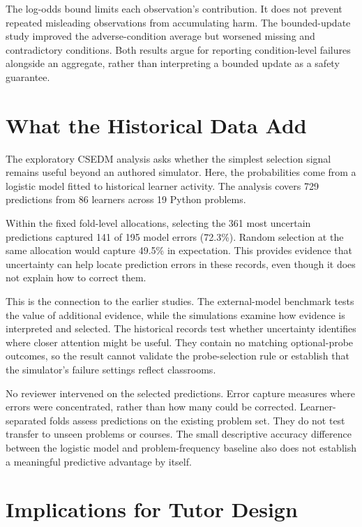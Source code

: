 The log-odds bound limits each observation's contribution. It does not prevent repeated misleading observations from accumulating
harm. The bounded-update study improved the adverse-condition average but worsened missing and contradictory conditions. Both results argue for
reporting condition-level failures alongside an aggregate, rather than interpreting a bounded update as a safety guarantee.

\section{What the Historical Data Add}

The exploratory CSEDM analysis asks whether the simplest selection signal remains useful beyond an authored simulator.
Here, the probabilities come from a logistic model fitted to historical learner activity. The analysis covers 729 predictions
from 86 learners across 19 Python problems.

Within the fixed fold-level allocations, selecting the 361 most uncertain predictions captured 141 of 195 model errors
(72.3\%). Random selection at the same allocation would capture 49.5\% in expectation. This provides evidence that
uncertainty can help locate prediction errors in these records, even though it does not explain how to correct them.

This is the connection to the earlier studies. The external-model benchmark tests the value of additional evidence, while
the simulations examine how evidence is interpreted and selected. The historical records test whether uncertainty identifies
where closer attention might be useful. They contain no matching optional-probe outcomes, so the result cannot validate the
probe-selection rule or establish that the simulator's failure settings reflect classrooms.

No reviewer intervened on the selected predictions. Error capture measures where errors were concentrated, rather than how many
could be corrected. Learner-separated folds assess predictions on the existing problem set. They do not test transfer to unseen
problems or courses. The small descriptive accuracy difference between the logistic model and problem-frequency baseline also
does not establish a meaningful predictive advantage by itself.

\section{Implications for Tutor Design}

